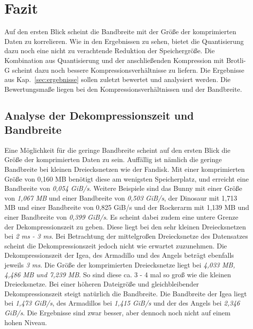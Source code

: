 \section{Fazit}
\label{sec:fazit}
Auf den ersten Blick scheint die Bandbreite mit der Größe der komprimierten Daten zu korrelieren.
Wie in den Ergebnissen zu sehen, bietet die Quantisierung dazu noch eine nicht zu verachtende Reduktion der Speichergröße.
Die Kombination aus Quantisierung und der anschließenden Kompression mit Brotli-G scheint dazu noch bessere Kompressionsverhältnisse zu liefern. \newline
Die Ergebnisse aus Kap.~\ref{sec:ergebnisse} sollen zuletzt bewertet und analysiert werden.
Die Bewertungsmaße liegen bei den Kompressionsverhältnissen und der Bandbreite.

\subsection{Analyse der Dekompressionszeit und Bandbreite}
\label{subsec:ana_bandwidth}
Eine Möglichkeit für die geringe Bandbreite scheint auf den ersten Blick die Größe der komprimierten Daten zu sein.
Auffällig ist nämlich die geringe Bandbreite bei kleinen Dreiecksnetzen wie der Fandisk.
Mit einer komprimierten Größe von 0,160 MB benötigt diese am wenigsten Speicherplatz, und erreicht eine Bandbreite von \textit{0,054 GiB/s}.
Weitere Beispiele sind das Bunny mit einer Größe von \textit{1,067 MB} und einer Bandbreite von \textit{0,503 GiB/s}, der Dinosaur mit 1,713 MB und einer Bandbreite von 0,825 GiB/s und der Rockerarm mit 1,139 MB und einer Bandbreite von \textit{0,399 GiB/s}.
Es scheint dabei zudem eine untere Grenze der Dekompressionszeit zu geben.
Diese liegt bei den sehr kleinen Dreiecksnetzen bei \textit{2 ms - 3 ms}.
Bei Betrachtung der mittelgroßen Dreiecksnetze des Datensatzes scheint die Dekompressionszeit jedoch nicht wie erwartet zuzunehmen.
Die Dekompressionszeit der Igea, des Armadillo und des Angels beträgt ebenfalls jeweils \textit{3 ms}.
Die Größe der komprimierten Dreiecksnetze liegt bei \textit{4,033 MB, 4,486 MB und 7,239 MB}.
So sind diese ca. 3 - 4 mal so groß wie die kleinen Dreiecksnetze. 
Bei einer höheren Dateigröße und gleichbleibender Dekompressionszeit steigt natürlich die Bandbreite. 
Die Bandbreite der Igea liegt bei \textit{1,473 GiB/s}, des Armadillos bei \textit{1,415 GiB/s} und der des Angels bei \textit{2,346 GiB/s}.
Die Ergebnisse sind zwar besser, aber dennoch noch nicht auf einem hohen Niveau. \newline


